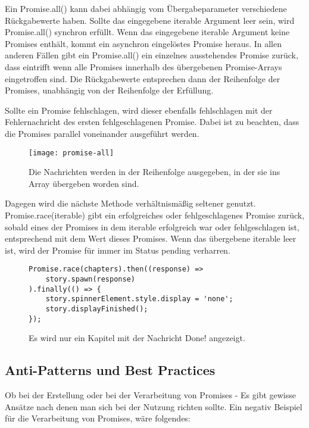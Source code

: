 \noindent
Ein Promise.all() kann dabei abhängig vom Übergabeparameter verschiedene Rückgabewerte haben. Sollte das eingegebene iterable Argument leer sein, wird Promise.all() synchron erfüllt. Wenn das eingegebene iterable Argument keine Promises enthält, kommt ein asynchron eingelöstes Promise heraus. In allen anderen Fällen gibt ein Promise.all() ein einzelnes ausstehendes Promise zurück, dass eintrifft wenn alle Promises innerhalb des übergebenen Promise-Arrays eingetroffen sind. Die Rückgabewerte entsprechen dann der Reihenfolge der Promises, unabhängig von der Reihenfolge der Erfüllung.\cite{promise-all}

\noindent
Sollte ein Promise fehlschlagen, wird dieser ebenfalls fehlschlagen mit der Fehlernachricht des ersten fehlgeschlagenen Promise.\cite{promise-executor} Dabei ist zu beachten, dass die Promises parallel voneinander ausgeführt werden.

\begin{figure}[H]
\centering
\texttt{[image: promise-all]}
\caption{Die Nachrichten werden in der Reihenfolge ausgegeben, in der sie ins Array übergeben worden sind.}
\end{figure}

\noindent
Dagegen wird die nächste Methode verhältnismäßig seltener genutzt. 
Promise.race(iterable) gibt ein erfolgreiches oder fehlgeschlagenes Promise zurück, sobald eines der Promises in dem iterable erfolgreich war oder fehlgeschlagen ist, entsprechend mit dem Wert dieses Promises.
Wenn das übergebene iterable leer ist, wird der Promise für immer im Status pending verharren.\cite{promise-race}

\begin{figure}[H]
\begin{lstlisting}[basicstyle=\small]
Promise.race(chapters).then((response) =>
    story.spawn(response)
).finally(() => {
    story.spinnerElement.style.display = 'none';
    story.displayFinished();
});
\end{lstlisting}
\caption{Es wird nur ein Kapitel mit der Nachricht \glqq Done!\grqq{} angezeigt.}
\end{figure}

\subsection{Anti-Patterns und Best Practices}

Ob bei der Erstellung oder bei der Verarbeitung von Promises - Es gibt gewisse Ansätze nach denen man sich bei der Nutzung richten sollte. Ein negativ Beispiel für die Verarbeitung von Promises, wäre folgendes:

